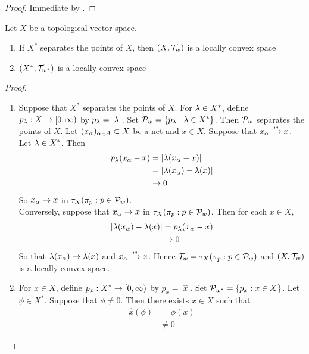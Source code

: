 \documentclass{book}
\begin{document}
	\begin{proof}
		Immediate by .
	\end{proof}
	
	\begin{ex}
		Let $X$ be a topological vector space. 
		\begin{enumerate}
			\item If $X^*$ separates the points of $X$, then  $(X, \mathcal{T}_w)$ is a locally convex space 
			\item $(X^*, \mathcal{T}_{w^*})$ is a locally convex space 
		\end{enumerate}
	\end{ex}
	
	\begin{proof}\
		\begin{enumerate}
			\item Suppose that $X^*$ separates the points of $X$. For $\lambda \in X^*$, define $p_{\lambda}:X \rightarrow [0,\infty)$ by $p_{\lambda} = |\lambda|$. Set $\mathcal{P}_{w} = \{p_{\lambda}: \lambda \in X^*\}$. Then $\mathcal{P}_{w}$ separates the points of $X$. Let $(x_{\alpha})_{\alpha \in A} \subset X$ be a net and $x \in X$. Suppose that $x_{\alpha} \xrightarrow{w} x$. Let $\lambda \in X^*$. Then 
			\begin{align*}
				p_{\lambda}(x_{\alpha} - x) 
				&= |\lambda(x_{\alpha} - x)| \\
				&= |\lambda(x_{\alpha}) - \lambda(x)| \\
				& \rightarrow 0
			\end{align*}
			So $x_{\alpha} \rightarrow x$ in $\tau_X(\pi_p: p \in \mathcal{P}_w)$. \\
			Conversely, suppose that $x_{\alpha} \rightarrow x$ in $\tau_X(\pi_p: p \in \mathcal{P}_w)$. Then for each $x \in X$,
			\begin{align*}
				|\lambda(x_{\alpha}) - \lambda(x)|
				&= p_{\lambda}(x_{\alpha} - x) \\
				& \rightarrow 0
			\end{align*}
			So that $\lambda(x_{\alpha}) \rightarrow \lambda(x)$ and $x_{\alpha} \xrightarrow{w} x$. Hence $\mathcal{T}_{w} = \tau_{X}(\pi_p: p \in \mathcal{P}_{w})$ and $(X, \mathcal{T}_{w})$ is a locally convex space.  \\
			\item For $x \in X$, define $p_x:X^* \rightarrow [0,\infty)$ by $p_x = |\hat{x}|$. Set $\mathcal{P}_{w^*} = \{p_x:x \in X\}$. Let $\phi \in X^*$. Suppose that $\phi \neq 0$. Then there exists $x \in X$ such that 
			\begin{align*}
				\hat{x}(\phi)
				& = \phi(x)  \\
				& \neq 0
			\end{align*}

\end{enumerate}
\end{proof}
\end{document}
